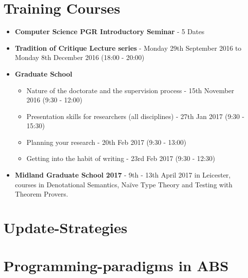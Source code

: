 \begin{appendices}

\chapter{Training Courses}
\label{app:courses}
\begin{itemize}
\item \textbf{Computer Science PGR Introductory Seminar} - 5 Dates
\item \textbf{Tradition of Critique Lecture series} - Monday 29th September 2016 to Monday 8th December 2016 (18:00 - 20:00)
\item \textbf{Graduate School}
	\begin{itemize}	
		\item Nature of the doctorate and the supervision process - 15th November 2016 (9:30 - 12:00)
		\item Presentation skills for researchers (all disciplines) - 27th Jan 2017 (9:30 - 15:30)
		\item Planning your research - 20th Feb 2017 (9:30 - 13:00)
		\item Getting into the habit of writing - 23rd Feb 2017 (9:30 - 12:30)
	\end{itemize}
\item \textbf{Midland Graduate School 2017} - 9th - 13th April 2017 in Leicester, courses in Denotational Semantics, Naïve Type Theory and Testing with Theorem Provers.
\end{itemize}



\chapter{Update-Strategies}
\label{app:updateStrategies}


\chapter{Programming-paradigms in ABS}
\label{app:paradigms}




\end{appendices}